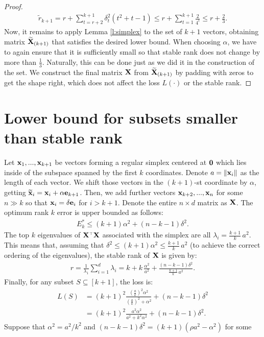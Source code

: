 \documentclass[12pt]{sty/colt2019/colt2018-arxiv}
\begin{document}
\begin{proof}
\begin{align*}
 \tilde r_{k+1} = r + \sum_{t=r+2}^{k+1} \delta_t^2 (t^2+t-1) \leq r +
      \sum_{t=1}^{k+1}\frac2{4^t}\leq r + \frac23.
    \end{align*}
  Now, it remains to apply Lemma \ref{l:simplex} to the set
  of $k+1$ vectors, obtaining matrix $\widetilde{\mathbf{X}}_{(k+1)}$ that satisfies the
desired lower bound. When choosing
  $\alpha$, we have to again ensure that it 
  is sufficiently small so that stable rank does not change by
  more than $\frac13$. Naturally, this can be done just as we did it
  in the construction of the set. We construct the final matrix $\mathbf X$
from $\widetilde{\mathbf{X}}_{(k+1)}$ by padding with zeros to get the shape right,
which does not affect the loss $L(\cdot)$ or the stable rank. 
\end{proof}

\section{Lower bound for subsets smaller than stable rank}
Let $\mathbf x_1,...,\mathbf x_{k+1}$ be vectors forming a regular simplex centered
at $\mathbf 0$ which lies inside of the subspace spanned by the first $k$
coordinates. Denote $a=\|\mathbf x_i\|$ as the length of each vector. We
shift those vectors in the $(k+1)$-st coordinate by $\alpha$, getting
$\widetilde{\mathbf x}_i=\mathbf x_i+\alpha\mathbf e_{k+1}$. Then, we add further vectors
$\mathbf x_{k+2},...,\mathbf x_n$ for some $n\gg k$ so that $\mathbf x_i=\delta\mathbf e_{i}$ for
$i>k+1$. Denote the entire $n\times d$ matrix as $\mathbf X$. The optimum
rank $k$ error is upper bounded as follows: 
\begin{align*}
  E_k^* \leq (k+1)\alpha^2 + (n-k-1)\delta^2.
\end{align*}
The top $k$ eigenvalues of $\X^\top\X$ associated with the simplex are all
$\lambda_i=\frac{k+1}{k}\,a^2$. This means that,
assuming that $\delta^2\leq(k+1)\alpha^2\leq \frac{k+1}{k}\,a^2$ (to
achieve the correct ordering of the eigenvalues), the
stable rank of $\mathbf X$ is given by:
\begin{align*}
  r = \frac1{\lambda_1}\sum_{i=1}^d\lambda_i = k +
  k\,\frac{\alpha^2}{a^2} + \frac{(n-k-1)\delta^2}{\frac{k+1}k\,a^2}.
\end{align*}
Finally, for any subset $S\subseteq[k+1]$, the loss is:
\begin{align*}
  L(S) &= (k+1)^2\frac{(\frac ak)^2\alpha^2}{(\frac ak)^2+\alpha^2} +
  (n-k-1)\delta^2\\
  &=(k+1)^2\frac{a^2\alpha^2}{a^2+k^2\alpha^2} +
  (n-k-1)\delta^2.
\end{align*}
Suppose that $\alpha^2=a^2/k^2$ and $(n-k-1)\delta^2 = (k+1)(\rho a^2-\alpha^2)$ for some
\end{document}
